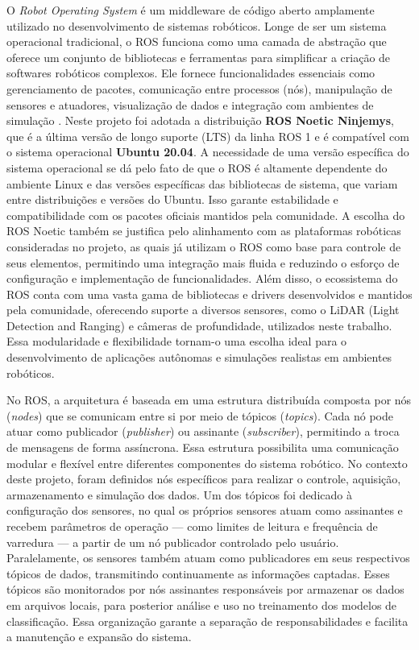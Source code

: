 O \textit{Robot Operating System} é um middleware de código aberto amplamente utilizado no desenvolvimento de sistemas robóticos. Longe de ser um sistema operacional tradicional, o ROS funciona como uma camada de abstração que oferece um conjunto de bibliotecas e ferramentas para simplificar a criação de softwares robóticos complexos. Ele fornece funcionalidades essenciais como gerenciamento de pacotes, comunicação entre processos (nós), manipulação de sensores e atuadores, visualização de dados e integração com ambientes de simulação \cite{quigley2009ros}. Neste projeto foi adotada a distribuição \textbf{ROS Noetic Ninjemys}, que é a última versão de longo suporte (LTS) da linha ROS 1 e é compatível com o sistema operacional \textbf{Ubuntu 20.04}. A necessidade de uma versão específica do sistema operacional se dá pelo fato de que o ROS é altamente dependente do ambiente Linux e das versões específicas das bibliotecas de sistema, que variam entre distribuições e versões do Ubuntu. Isso garante estabilidade e compatibilidade com os pacotes oficiais mantidos pela comunidade. A escolha do ROS Noetic também se justifica pelo alinhamento com as plataformas robóticas consideradas no projeto, as quais já utilizam o ROS como base para controle de seus elementos, permitindo uma integração mais fluida e reduzindo o esforço de configuração e implementação de funcionalidades. Além disso, o ecossistema do ROS conta com uma vasta gama de bibliotecas e drivers desenvolvidos e mantidos pela comunidade, oferecendo suporte a diversos sensores, como o LiDAR (Light Detection and Ranging) e câmeras de profundidade, utilizados neste trabalho. Essa modularidade e flexibilidade tornam-o uma escolha ideal para o desenvolvimento de aplicações autônomas e simulações realistas em ambientes robóticos.

No ROS, a arquitetura é baseada em uma estrutura distribuída composta por nós (\textit{nodes}) que se comunicam entre si por meio de tópicos (\textit{topics}). Cada nó pode atuar como publicador (\textit{publisher}) ou assinante (\textit{subscriber}), permitindo a troca de mensagens de forma assíncrona. Essa estrutura possibilita uma comunicação modular e flexível entre diferentes componentes do sistema robótico. No contexto deste projeto, foram definidos nós específicos para realizar o controle, aquisição, armazenamento e simulação dos dados. Um dos tópicos foi dedicado à configuração dos sensores, no qual os próprios sensores atuam como assinantes e recebem parâmetros de operação — como limites de leitura e frequência de varredura — a partir de um nó publicador controlado pelo usuário. Paralelamente, os sensores também atuam como publicadores em seus respectivos tópicos de dados, transmitindo continuamente as informações captadas. Esses tópicos são monitorados por nós assinantes responsáveis por armazenar os dados em arquivos locais, para posterior análise e uso no treinamento dos modelos de classificação. Essa organização garante a separação de responsabilidades e facilita a manutenção e expansão do sistema.

